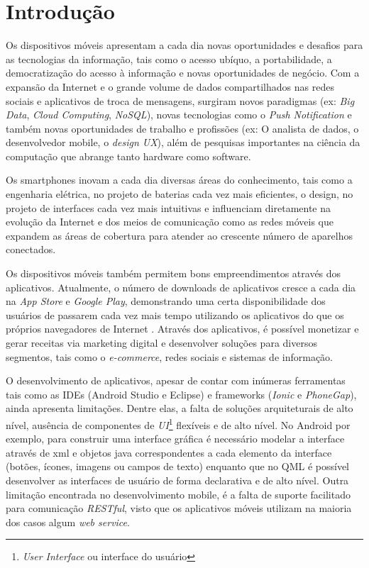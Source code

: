 \section{Introdução}\label{sec:introducao}
Os dispositivos móveis apresentam a cada dia novas oportunidades e desafios para as tecnologias da informação, tais como o acesso ubíquo, a portabilidade, a democratização do acesso à informação e novas oportunidades de negócio. Com a expansão da Internet e o grande volume de dados compartilhados nas redes sociais e aplicativos de troca de mensagens, surgiram novos paradigmas (ex: \textit{Big Data}, \textit{Cloud Computing}, \textit{NoSQL}), novas tecnologias como o \textit{Push Notification} e também novas oportunidades de trabalho e profissões (ex: O analista de dados, o desenvolvedor mobile, o \textit{design UX}), além de pesquisas importantes na ciência da computação que abrange tanto hardware como software.\par

Os smartphones inovam a cada dia diversas áreas do conhecimento, tais como a engenharia elétrica, no projeto de baterias cada vez mais eficientes, o design, no projeto de interfaces cada vez mais intuitivas e influenciam diretamente na evolução da Internet e dos meios de comunicação como as redes móveis que expandem as áreas de cobertura para atender ao crescente número de aparelhos conectados.\par

Os dispositivos móveis também permitem bons empreendimentos através dos aplicativos. Atualmente, o número de downloads de aplicativos cresce a cada dia na \textit{App Store} e \textit{Google Play}, demonstrando uma certa disponibilidade dos usuários de passarem cada vez mais tempo utilizando os aplicativos do que os próprios navegadores de Internet \cite{D&T}. Através dos aplicativos, é possível monetizar e gerar receitas via marketing digital e desenvolver soluções para diversos segmentos, tais como o \textit{e-commerce}, redes sociais e sistemas de informação.\par

O desenvolvimento de aplicativos, apesar de contar com inúmeras ferramentas tais como as IDEs (Android Studio e Eclipse) e frameworks (\textit{Ionic} e \textit{PhoneGap}), ainda apresenta limitações. Dentre elas, a falta de soluções arquiteturais de alto nível, ausência de componentes de \textit{UI}\footnote{\textit{User Interface} ou interface do usuário} flexíveis e de alto nível. No Android por exemplo, para construir uma interface gráfica é necessário modelar a interface através de xml e objetos java correspondentes a cada elemento da interface (botões, ícones, imagens ou campos de texto) enquanto que no QML é possível desenvolver as interfaces de usuário de forma declarativa e de alto nível. Outra limitação encontrada no desenvolvimento mobile, é a falta de suporte facilitado para comunicação \textit{RESTful}, visto que os aplicativos móveis utilizam na maioria dos casos algum \textit{web service}.

